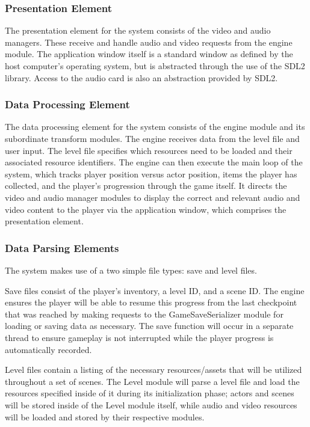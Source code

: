 \documentclass{article}
\begin{document}
		\subsubsection{Presentation Element}
			The presentation element for the system consists of the video and audio managers. These receive and handle audio and video requests from the engine module. The application window itself is a standard window as defined by the host computer's operating system, but is abstracted through the use of the SDL2 library. Access to the audio card is also an abstraction provided by SDL2.

		\subsubsection{Data Processing Element}
			The data processing element for the system consists of the engine module and its subordinate transform modules. The engine receives data from the level file and user input. The level file specifies which resources need to be loaded and their associated resource identifiers. The engine can then execute the main loop of the system, which tracks player position versus actor position, items the player has collected, and the player's progression through the game itself. It directs the video and audio manager modules to display the correct and relevant audio and video content to the player via the application window, which comprises the presentation element. 

		\subsubsection{Data Parsing Elements}
			  The system makes use of a two simple file types: save and level files.

        Save files consist of the player's inventory, a level ID, and a scene ID. The engine ensures the player will be able to resume this progress from the last checkpoint that was reached by making requests to the GameSaveSerializer module for loading or saving data as necessary. The save function will occur in a separate thread to ensure gameplay is not interrupted while the player progress is automatically recorded.

        Level files contain a listing of the necessary resources/assets that will be utilized throughout a set of scenes. The Level module will parse a level file and load the resources specified inside of it during its initialization phase; actors and scenes will be stored inside of the Level module itself, while audio and video resources will be loaded and stored by their respective modules.
\end{document}
